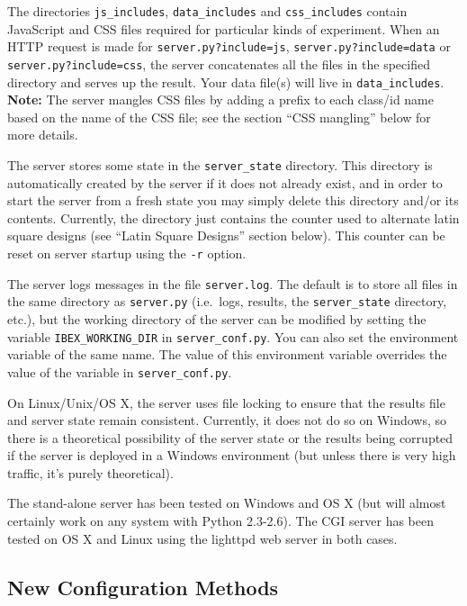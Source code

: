 \documentclass[]{article}
\begin{document}
The directories \texttt{js\_includes}, \texttt{data\_includes} and
\texttt{css\_includes} contain JavaScript and CSS files required for
particular kinds of experiment. When an HTTP request is made for
\texttt{server.py?include=js}, \texttt{server.py?include=data} or
\texttt{server.py?include=css}, the server concatenates all the files in
the specified directory and serves up the result. Your data file(s) will
live in \texttt{data\_includes}. \textbf{Note:} The server mangles CSS
files by adding a prefix to each class/id name based on the name of the
CSS file; see the section ``CSS mangling'' below for more details.

The server stores some state in the \texttt{server\_state} directory.
This directory is automatically created by the server if it does not
already exist, and in order to start the server from a fresh state you
may simply delete this directory and/or its contents. Currently, the
directory just contains the counter used to alternate latin square
designs (see ``Latin Square Designs'' section below). This counter can
be reset on server startup using the \texttt{-r} option.

The server logs messages in the file \texttt{server.log}. The default is
to store all files in the same directory as \texttt{server.py}
(i.e.~logs, results, the \texttt{server\_state} directory, etc.), but
the working directory of the server can be modified by setting the
variable \texttt{IBEX\_WORKING\_DIR} in \texttt{server\_conf.py}. You
can also set the environment variable of the same name. The value of
this environment variable overrides the value of the variable in
\texttt{server\_conf.py}.

On Linux/Unix/OS X, the server uses file locking to ensure that the
results file and server state remain consistent. Currently, it does not
do so on Windows, so there is a theoretical possibility of the server
state or the results being corrupted if the server is deployed in a
Windows environment (but unless there is very high traffic, it's purely
theoretical).

The stand-alone server has been tested on Windows and OS X (but will
almost certainly work on any system with Python 2.3-2.6). The CGI server
has been tested on OS X and Linux using the lighttpd web server in both
cases.

\subsection{New Configuration Methods}\label{new-configuration-methods}
\end{document}
